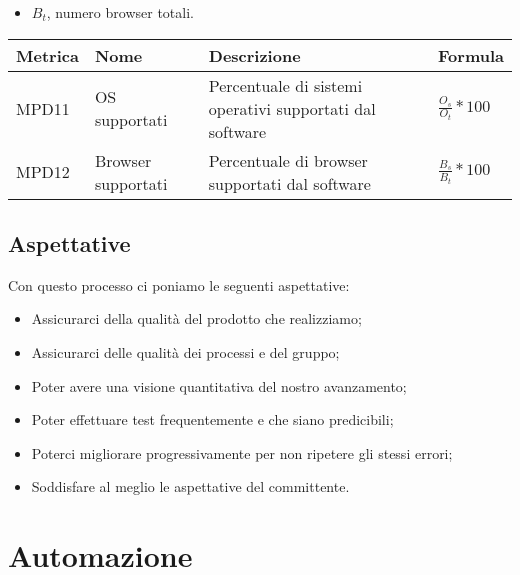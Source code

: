 \begin{itemize}
\begin{itemize}
                \item $B_t$, numero browser totali.
            \end{itemize}
            \begin{center}
                \begin{tabular}{|p{2cm}|p{3.5cm}|p{5.5cm}|p{3.5cm}|} \hline
                  \textbf{Metrica} & \textbf{Nome} & \textbf{Descrizione} & \textbf{Formula}    \\ \hline
                  MPD11 & OS supportati & Percentuale di sistemi operativi supportati dal software & $\frac{O_s}{O_t}*100$  \\ \hline
                  MPD12 & Browser supportati & Percentuale di browser supportati dal software & $\frac{B_s}{B_t}*100$  \\ \hline
                \end{tabular}
            \end{center}
   \end{itemize} 

  \subsection{Aspettative}
  Con questo processo ci poniamo le seguenti aspettative:
  \begin{itemize}
      \item Assicurarci della qualità del prodotto che realizziamo;
      \item Assicurarci delle qualità dei processi e del gruppo;
      \item Poter avere una visione quantitativa del nostro avanzamento;
      \item Poter effettuare test frequentemente e che siano predicibili;
      \item Poterci migliorare progressivamente per non ripetere gli stessi errori;
      \item Soddisfare al meglio le aspettative del committente.
  \end{itemize}

\section{Automazione}
